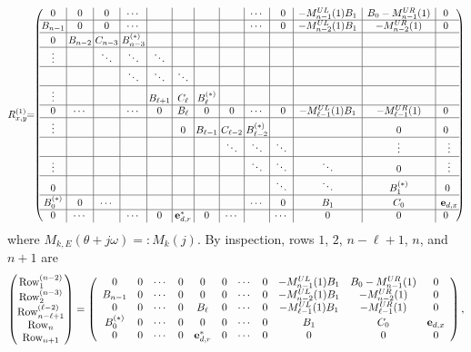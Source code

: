 \documentclass[11pt]{amsart}
\begin{document}
\begin{align}\label{eq:R(1)}
R^{(1)}_{x,y} \!\!
=\!\!
\left(\!\!\begin{array}{c|c|c|c|c|c|c|c|c|c|c|c|c}
\!\!0 \!\!& 0 &0 &\cdots & &  & & &\cdots &\!\!0\!\! \!\!&-M_{n-1}^{UL}(1)B_1 &B_0-M_{n-1}^{UR}(1) & \!\!0 \\
\hline
\!\!B_{n-1}\!\! &0 &0 &\cdots & & & & &\cdots &\!\!0\!\!\!\! &-M_{n-2}^{UL}(1)B_1 &-M_{n-2}^{UR}(1) & \!\!0 \\
\hline 
\!\!0\!\!&\!\!B_{n-2} \!\!&\!\!C_{n-3} \!\!&\!\!B_{n-3}^{(*)} \!\!& & & & & & & & &\\
\hline
\vdots& &\ddots &\ddots &\ddots & & & & & & & &\\
\hline
& & & \ddots &\ddots &\ddots & & & & & & &\\
\hline
\vdots & & & &\!\!B_{\ell+1} \!\!&\!\!C_{\ell}\!\! &\!\!B_\ell^{(*)}\!\!& & & & & &\\
\hline
\!\!0\!\!&\cdots & &\cdots &\!\!0 \!\!&\!\!B_\ell \!\!&\!\!0 \!\!&\!\!0\!\! &\cdots &\!\!0\!\! \!\!&-M_{\ell-1}^{UL}(1)B_1 &-M_{\ell-1}^{UR}(1) & \!\!0\\
\hline
\vdots & & & & &\!\!0 \!\!&\!\!B_{\ell-1}\!\! &\!\!C_{\ell-2} \!\!&\!\!B_{\ell-2}^{(*)} \!\!& & &0 &\!\!0\\
\hline
& & & & & & &\ddots &\ddots &\ddots & &\vdots &\vdots\!\!\\
\hline
\vdots& & & & & & & &\ddots &\ddots &\ddots &0 &\vdots\!\!\\
\hline
\!\!0\!\!& & & & & & & & &\ddots &\ddots &B_1^{(*)} &\!\!0\!\!\\
\hline
\!\! B_0^{(*)}\!\! &\!\!0 \!\!&\cdots & & & & & &\cdots &\!\!0 \!\!\!\!&B_1 &C_0 &{\bf e}_{d,x}\!\!\\
\hline
\!\!0\!\! &\cdots & &\cdots &\!\! 0 \!\!&\!\!{\bf e}_{d,r}^*\!\! & \!\!0\!\! &\cdots & &\cdots &  0 & 0 & \!\!0 
\end{array}\!\!\right)
\end{align}
where   $M_{k,E}(\theta+j\omega)=:M_k(j)$. By inspection, rows $1$, $2$, $n-\ell+1$, $n$, and $n+1$ are
\begin{align}
\left(\begin{matrix}
\text{Row}_1^{(n-2)}\\
\text{Row}_2^{(n-3)}\\
\text{Row}_{n-\ell+1}^{(\ell-2)}\\
\text{Row}_{n}\\
\text{Row}_{n+1}
\end{matrix}
\right)
=\left(\begin{array}{ccccccccccc}
0 &0 &\cdots &0 &0 &0 &\cdots &0 &-M_{n-1}^{UL}(1)B_1 &B_0-M_{n-1}^{UR}(1) &0\\
B_{n-1} &0 &\cdots &0 &0 &0 &\cdots &0 &-M_{n-2}^{UL}(1)B_1 &-M_{n-2}^{UR}(1) &0\\
0 &0 &\cdots &0 &B_\ell &0 &\cdots &0 &-M_{\ell-1}^{UL}(1)B_1 &-M_{\ell-1}^{UR}(1) &0\\
B_0^{(*)} &0 &\cdots &0 &0 &0 &\cdots &0 &B_1 &C_0 &{\bf e}_{d,x}\\
0 &0 &\cdots &0 &{\bf e}_{d,r}^* &0 &\cdots &0 &0 &0 &0
\end{array}\right),
\end{align}
\end{document}
